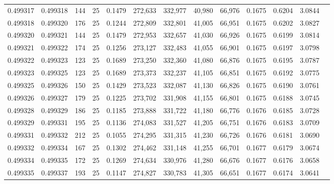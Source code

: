 \begin{tabular}{rrrrrrrrrrrrr}
0.499317 & 0.499318 & 144 &  25 &                                     0.1479 & 272,633 & 332,977 &  40,980 &  66,976 & 0.1675 & 0.6204 & 3.0844 \\
0.499318 & 0.499320 & 176 &  25 &                                     0.1244 & 272,809 & 332,801 &  41,005 &  66,951 & 0.1675 & 0.6202 & 3.0827 \\
0.499320 & 0.499321 & 144 &  25 &                                     0.1479 & 272,953 & 332,657 &  41,030 &  66,926 & 0.1675 & 0.6199 & 3.0814 \\
0.499321 & 0.499322 & 174 &  25 &                                     0.1256 & 273,127 & 332,483 &  41,055 &  66,901 & 0.1675 & 0.6197 & 3.0798 \\
0.499322 & 0.499323 & 123 &  25 &                                     0.1689 & 273,250 & 332,360 &  41,080 &  66,876 & 0.1675 & 0.6195 & 3.0787 \\
0.499323 & 0.499325 & 123 &  25 &                                     0.1689 & 273,373 & 332,237 &  41,105 &  66,851 & 0.1675 & 0.6192 & 3.0775 \\
0.499325 & 0.499326 & 150 &  25 &                                     0.1429 & 273,523 & 332,087 &  41,130 &  66,826 & 0.1675 & 0.6190 & 3.0761 \\
0.499326 & 0.499327 & 179 &  25 &                                     0.1225 & 273,702 & 331,908 &  41,155 &  66,801 & 0.1675 & 0.6188 & 3.0745 \\
0.499328 & 0.499329 & 186 &  25 &                                     0.1185 & 273,888 & 331,722 &  41,180 &  66,776 & 0.1676 & 0.6185 & 3.0728 \\
0.499329 & 0.499331 & 195 &  25 &                                     0.1136 & 274,083 & 331,527 &  41,205 &  66,751 & 0.1676 & 0.6183 & 3.0709 \\
0.499331 & 0.499332 & 212 &  25 &                                     0.1055 & 274,295 & 331,315 &  41,230 &  66,726 & 0.1676 & 0.6181 & 3.0690 \\
0.499332 & 0.499334 & 167 &  25 &                                     0.1302 & 274,462 & 331,148 &  41,255 &  66,701 & 0.1677 & 0.6179 & 3.0674 \\
0.499334 & 0.499335 & 172 &  25 &                                     0.1269 & 274,634 & 330,976 &  41,280 &  66,676 & 0.1677 & 0.6176 & 3.0658 \\
0.499335 & 0.499337 & 193 &  25 &                                     0.1147 & 274,827 & 330,783 &  41,305 &  66,651 & 0.1677 & 0.6174 & 3.0641 \\

\end{tabular}
